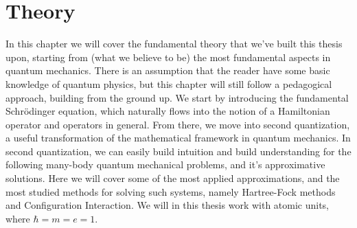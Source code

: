 \documentclass{subfiles}
\begin{document}
\chapter{Theory}
In this chapter we will cover the fundamental theory that we've built this thesis upon, starting from (what we believe to be) the most fundamental aspects in quantum mechanics.
There is an assumption that the reader have some basic knowledge of quantum physics, but this chapter will still follow a pedagogical approach, building from the ground up.
We start by introducing the fundamental Schrödinger equation, which naturally flows into the notion of a Hamiltonian operator and operators in general. From there, we move into 
second quantization, a useful transformation of the mathematical framework in quantum mechanics. In second quantization, we can easily build intuition and build understanding for
the following many-body quantum mechanical problems, and it's approximative solutions. Here we will cover some of the most applied approximations, and the most studied methods for solving
such systems, namely Hartree-Fock methods and Configuration Interaction. We will in this thesis work with atomic units, where $\hbar = m = e = 1$.
\newpage



\end{document}
